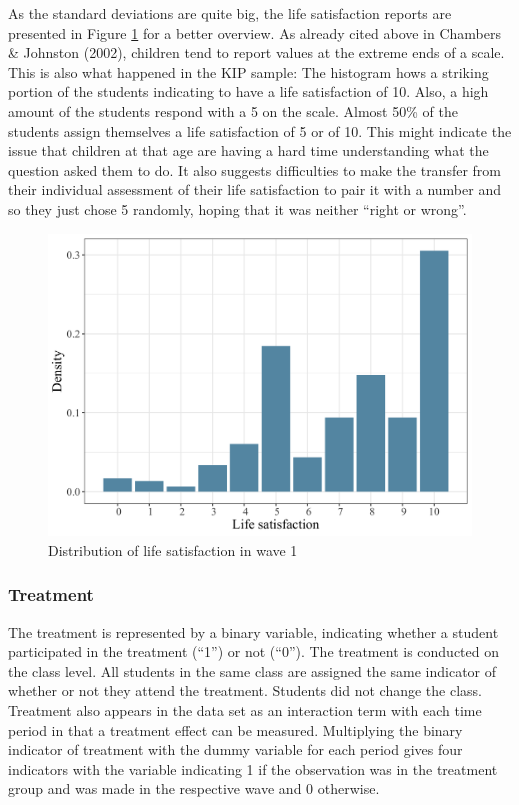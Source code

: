 \documentclass[a4, 12pt]{article}
\begin{document}
As the standard deviations are quite big, the life satisfaction reports are presented in Figure \ref{fig:hist-lsat} for a better overview. As already cited above in Chambers \& Johnston (2002), children tend to report values at the extreme ends of a scale. This is also what happened in the KIP sample: The histogram hows a striking portion of the students indicating to have a life satisfaction of 10. Also, a high amount of the students respond with a 5 on the scale. Almost 50\% of the students assign themselves a life satisfaction of 5 or of 10. This might indicate the issue that children at that age are having a hard time understanding what the question asked them to do. It also suggests difficulties to make the transfer from their individual assessment of their life satisfaction to pair it with a number and so they just chose 5 randomly, hoping that it was neither ``right or wrong''.

\begin{figure}[H]

{\centering \includegraphics[width=0.8\linewidth,]{../figures/lsat_bar} 

}

\caption{Distribution of life satisfaction in wave 1}\label{fig:hist-lsat}
\end{figure}

\hypertarget{treatment}{%
\subsubsection{Treatment}\label{treatment}}

The treatment is represented by a binary variable, indicating whether a student participated in the treatment (``1'') or not (``0''). The treatment is conducted on the class level. All students in the same class are assigned the same indicator of whether or not they attend the treatment. Students did not change the class. Treatment also appears in the data set as an interaction term with each time period in that a treatment effect can be measured. Multiplying the binary indicator of treatment with the dummy variable for each period gives four indicators with the variable indicating 1 if the observation was in the treatment group and was made in the respective wave and 0 otherwise.
\end{document}
